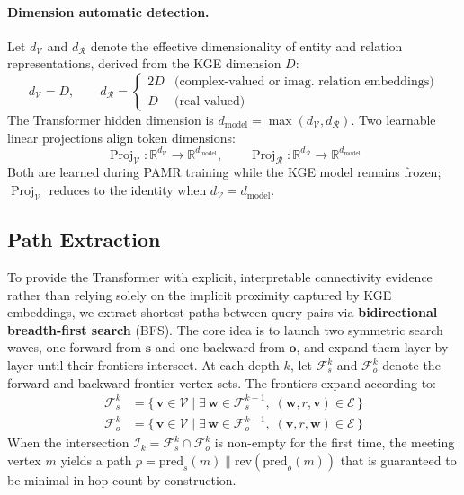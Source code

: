 \paragraph{Dimension automatic detection.}
Let $d_{\mathcal{V}}$ and $d_{\mathcal{R}}$ denote the effective dimensionality of entity and
relation representations, derived from the KGE dimension $D$:
\begin{equation}
d_{\mathcal{V}} = D,\qquad
d_{\mathcal{R}} = \begin{cases}2D & \text{(complex-valued or imag. relation embeddings)} \\ D & \text{(real-valued)}\end{cases}
\label{eq:dim}
\end{equation}
The Transformer hidden dimension is $d_{\text{model}} = \max(d_{\mathcal{V}}, d_{\mathcal{R}})$.
Two learnable linear projections align token dimensions:
\begin{equation}
\operatorname{Proj}_{\mathcal{V}}: \mathbb{R}^{d_{\mathcal{V}}} \to \mathbb{R}^{d_{\text{model}}},\qquad
\operatorname{Proj}_{\mathcal{R}}: \mathbb{R}^{d_{\mathcal{R}}} \to \mathbb{R}^{d_{\text{model}}}
\label{eq:projections}
\end{equation}
Both are learned during PAMR training while the KGE model remains frozen;
$\operatorname{Proj}_{\mathcal{V}}$ reduces to the identity when $d_{\mathcal{V}} = d_{\text{model}}$.

\vspace{-1em}
\subsection{Path Extraction}
\vspace{-1em}
\label{sec:path-extraction}

To provide the Transformer with explicit, interpretable connectivity evidence rather than
relying solely on the implicit proximity captured by KGE embeddings, we extract shortest
paths between query pairs via \textbf{bidirectional breadth-first search} (BFS).  The
core idea is to launch two
symmetric search waves, one forward from $\mathbf{s}$ and one backward from $\mathbf{o}$, and
expand them layer by layer until their frontiers intersect.  At each depth $k$, let
$\mathcal{F}_s^{k}$ and $\mathcal{F}_o^{k}$ denote the forward and backward frontier vertex
sets.  The frontiers expand according to:
\begin{align}
\mathcal{F}_s^{k} &= \{\, \mathbf{v} \in \mathcal{V} \mid \exists\, \mathbf{w} \in \mathcal{F}_s^{k-1},\;
   (\mathbf{w}, r, \mathbf{v}) \in \mathcal{E} \,\} \label{eq:fw-frontier} \\
\mathcal{F}_o^{k} &= \{\, \mathbf{v} \in \mathcal{V} \mid \exists\, \mathbf{w} \in \mathcal{F}_o^{k-1},\;
   (\mathbf{v}, r, \mathbf{w}) \in \mathcal{E} \,\} \label{eq:bw-frontier}
\end{align}
When the intersection $\mathcal{I}_k = \mathcal{F}_s^{k} \cap \mathcal{F}_o^{k}$ is non-empty for
the first time, the meeting vertex $m$ yields a path $p = \text{pred}_s(m) \parallel \text{rev}(\text{pred}_o(m))$
that is guaranteed to be minimal in hop count by construction.


